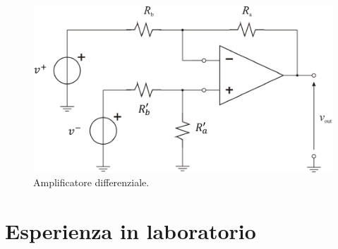 \documentclass[a4paper]{article}
\begin{document}
				\begin{figure}[h!]
					\centering
					\includegraphics[scale=0.7]{amplificatoreDifferenziale}
					\caption{Amplificatore differenziale.}
					\label{fig:amplificatoreDifferenziale}
				\end{figure}
				\newpage
	\section{Esperienza in laboratorio}
\end{document}
